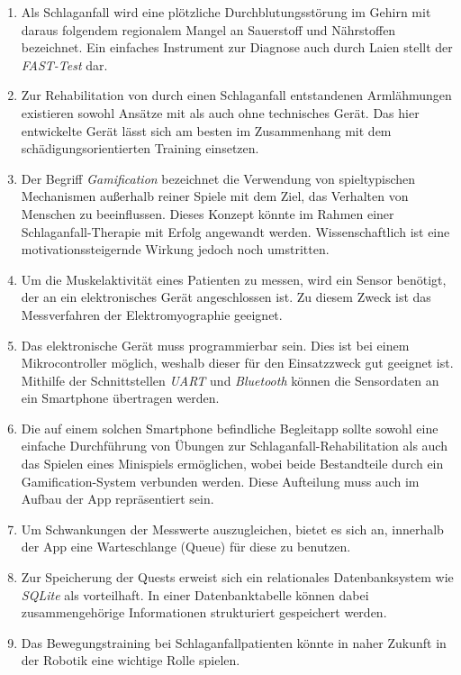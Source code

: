 \documentclass[a4paper, 12pt]{scrartcl}
\begin{document}
\begin{enumerate}
	\item Als Schlaganfall wird eine plötzliche Durchblutungsstörung im Gehirn mit daraus folgendem regionalem Mangel an Sauerstoff und Nährstoffen bezeichnet. Ein einfaches Instrument zur Diagnose auch durch Laien stellt der \emph{FAST-Test} dar.
	\item Zur Rehabilitation von durch einen Schlaganfall entstandenen Armlähmungen existieren sowohl Ansätze mit als auch ohne technisches Gerät. Das hier entwickelte Gerät lässt sich am besten im Zusammenhang mit dem schädigungsorientierten Training einsetzen.
	\item Der Begriff \emph{Gamification} bezeichnet die Verwendung von spieltypischen Mechanismen außerhalb reiner Spiele mit dem Ziel, das Verhalten von Menschen zu beeinflussen. Dieses Konzept könnte im Rahmen einer Schlaganfall-Therapie mit Erfolg angewandt werden. Wissenschaftlich ist eine motivationssteigernde Wirkung jedoch noch umstritten.
	\item Um die Muskelaktivität eines Patienten zu messen, wird ein Sensor benötigt, der an ein elektronisches Gerät angeschlossen ist. Zu diesem Zweck ist das Messverfahren der Elektromyographie geeignet.
	\item Das elektronische Gerät muss programmierbar sein. Dies ist bei einem Mikrocontroller möglich, weshalb dieser für den Einsatzzweck gut geeignet ist. Mithilfe der Schnittstellen \emph{UART} und \emph{Bluetooth} können die Sensordaten an ein Smartphone übertragen werden.
	\item Die auf einem solchen Smartphone befindliche Begleitapp sollte sowohl eine einfache Durchführung von Übungen zur Schlaganfall-Rehabilitation als auch das Spielen eines Minispiels ermöglichen, wobei beide Bestandteile durch ein Gamification-System verbunden werden. Diese Aufteilung muss auch im Aufbau der App repräsentiert sein.
	\item Um Schwankungen der Messwerte auszugleichen, bietet es sich an, innerhalb der App eine Warteschlange (Queue) für diese zu benutzen.
	\item Zur Speicherung der Quests erweist sich ein relationales Datenbanksystem wie \emph{SQLite} als vorteilhaft. In einer Datenbanktabelle können dabei zusammengehörige Informationen strukturiert gespeichert werden.
	\item Das Bewegungstraining bei Schlaganfallpatienten könnte in naher Zukunft in der Robotik eine wichtige Rolle spielen.
\end{enumerate}
\end{document}

